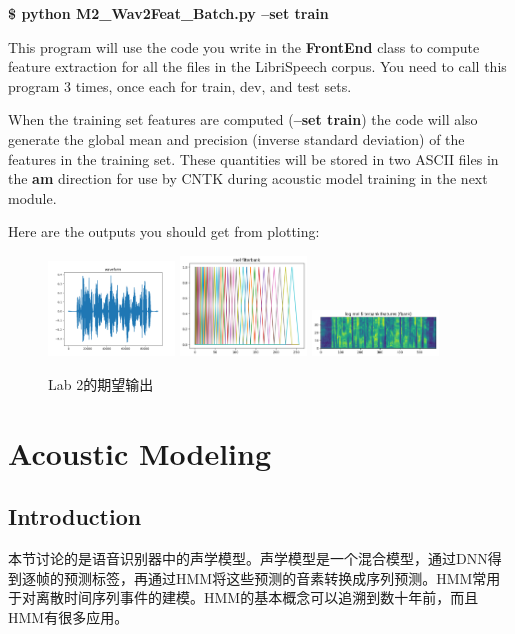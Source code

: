 {\bf \$ python M2\_Wav2Feat\_Batch.py –set train}

This program will use the code you write in the {\bf FrontEnd} class to compute feature extraction for all the files in the LibriSpeech corpus. You need to call this program 3 times, once each for train, dev, and test sets.

When the training set features are computed ({\bf –set train}) the code will also generate the global mean and precision (inverse standard deviation) of the features in the training set. These quantities will be stored in two ASCII files in the {\bf am} direction for use by CNTK during acoustic model training in the next module.

Here are the outputs you should get from plotting:
\begin{figure}[!ht]
  \centering
  \includegraphics[width=0.30\textwidth]{figure/lab2-1}
  \hspace{0.5cm}
  \includegraphics[width=0.30\textwidth]{figure/lab2-2}
  \hspace{0.5cm}
  \includegraphics[width=0.30\textwidth]{figure/lab2-3}
  \caption{Lab 2的期望输出}
\label{fig:expect-output}
\end{figure}

\section{Acoustic Modeling}
\subsection{Introduction} 
本节讨论的是语音识别器中的声学模型。声学模型是一个混合模型，通过DNN得到逐帧的预测标签，再通过HMM将这些预测的音素转换成序列预测。HMM常用于对离散时间序列事件的建模。HMM的基本概念可以追溯到数十年前，而且HMM有很多应用。

